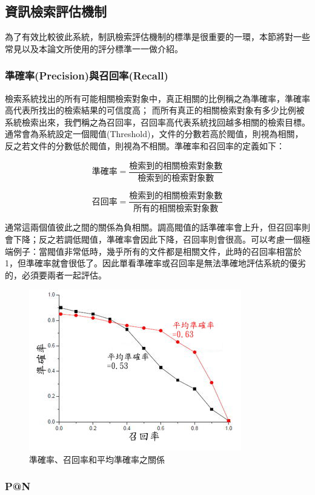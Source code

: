 \vspace{20mm}
\subsection{資訊檢索評估機制}
為了有效比較彼此系統，制訊檢索評估機制的標準是很重要的一環，本節將對一些常見以及本論文所使用的評分標準一一做介紹。

\subsubsection{準確率(Precision)與召回率(Recall)}
檢索系統找出的所有可能相關檢索對象中，真正相關的比例稱之為準確率，準確率高代表所找出的檢索結果的可信度高；
而所有真正的相關檢索對象有多少比例被系統檢索出來，我們稱之為召回率，召回率高代表系統找回越多相關的檢索目標。通常會為系統設定一個閥值(Threshold)，文件的分數若高於閥值，則視為相關，反之若文件的分數低於閥值，則視為不相關。準確率和召回率的定義如下：

\[
\text{準確率}=\frac{\text{檢索到的相關檢索對象數}}{\text{檢索到的檢索對象數}}
\]

\[
\text{召回率}=\frac{\text{檢索到的相關檢索對象數}}{\text{所有的相關檢索對象數}}
\]

通常這兩個值彼此之間的關係為負相關。調高閥值的話準確率會上升，但召回率則會下降；反之若調低閥值，準確率會因此下降，召回率則會很高。可以考慮一個極端例子：當閥值非常低時，幾乎所有的文件都是相關文件，此時的召回率相當於1，但準確率就會很低了。因此單看準確率或召回率是無法準確地評估系統的優劣的，必須要兩者一起評估。

\begin{figure}
\centering
\includegraphics[scale=1.0]{images/chap2_precision_recall.png}
\caption{準確率、召回率和平均準確率之關係} \label{fig:precision_recall}
\end{figure}

\subsubsection{P@N}

